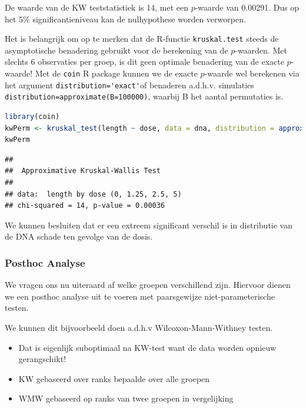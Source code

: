 \documentclass[
  12pt,dutch,coursenotes]{book}
\newcommand{\passthrough}[1]{#1}
\providecommand{\tightlist}{%
  \setlength{\itemsep}{0pt}\setlength{\parskip}{0pt}}
\theoremstyle{definition}
\theoremstyle{definition}
\theoremstyle{definition}
\theoremstyle{definition}
\theoremstyle{remark}
\begin{document}
De waarde van de KW teststatistiek is 14, met een \(p\)-waarde van 0.00291. Dus op het \(5\%\) significantieniveau kan de nulhypothese worden verworpen.

Het is belangrijk om op te merken dat de R-functie \passthrough{\lstinline!kruskal.test!} steeds de asymptotische benadering gebruikt voor de berekening van de \(p\)-waarden. Met slechts 6 observaties per groep, is dit geen optimale benadering van de exacte \(p\)-waarde!
Met de \passthrough{\lstinline!coin!} R package kunnen we de exacte \(p\)-waarde wel berekenen via het argument \passthrough{\lstinline!distribution='exact'!}of benaderen a.d.h.v. simulaties \passthrough{\lstinline!distribution=approximate(B=100000)!}, waarbij B het aantal permutaties is.

\begin{lstlisting}[language=R]
library(coin)
kwPerm <- kruskal_test(length ~ dose, data = dna, distribution = approximate(nresample = 1e+05))
kwPerm
\end{lstlisting}

\begin{lstlisting}
## 
##  Approximative Kruskal-Wallis Test
## 
## data:  length by dose (0, 1.25, 2.5, 5)
## chi-squared = 14, p-value = 0.00036
\end{lstlisting}

We kunnen besluiten dat er een extreem significant verschil is in distributie van de DNA schade ten gevolge van de dosis.

\hypertarget{posthoc-analyse}{%
\subsubsection{Posthoc Analyse}\label{posthoc-analyse}}

We vragen ons nu uiteraard af welke groepen verschillend zijn. Hiervoor dienen we een posthoc analyse uit te voeren met paarsgewijze niet-parameterische testen.

We kunnen dit bijvoorbeeld doen a.d.h.v Wilcoxon-Mann-Withney testen.

\begin{itemize}
\tightlist
\item
  Dat is eigenlijk suboptimaal na KW-test want de data worden opnieuw gerangschikt!
\item
  KW gebaseerd over ranks bepaalde over alle groepen
\item
  WMW gebaseerd op ranks van twee groepen in vergelijking
\end{itemize}
\end{document}
